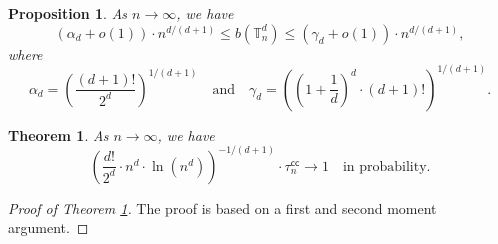 \documentclass[10pt,a4paper]{amsart}
\theoremstyle{plain}
\newtheorem{thm}{Theorem}
\newtheorem{prop}{Proposition}
\theoremstyle{remark}
\begin{document}
\begin{prop}\label{prop:detbounds}
As $n\to\infty$, we have
\[\left(\alpha_d+o(1)\right)\cdot n^{d/(d+1)}\leq b\left(\mathbb{T}_n^d\right)\leq\left(\gamma_d+o(1)\right)\cdot n^{d/(d+1)},\]
where
\[\alpha_d=\left(\frac{(d+1)!}{2^d}\right)^{1/(d+1)}\quad\text{and}\quad\gamma_d=\left(\left(1+\frac{1}{d}\right)^d\cdot(d+1)!\right)^{1/(d+1)}.\]
\end{prop}

\begin{thm}\label{thm:couponcollector}
As $n\to\infty$, we have
\[\left(\frac{d!}{2^d}\cdot n^d\cdot\ln\left(n^d\right)\right)^{-1/(d+1)}\cdot\tau_n^\mathsf{cc}\longrightarrow1\quad\text{in probability.}\]
\end{thm}

\begin{proof}[Proof of Theorem \ref{thm:couponcollector}]
The proof is based on a first and second moment argument.

\medskip


\end{proof}
\end{document}
